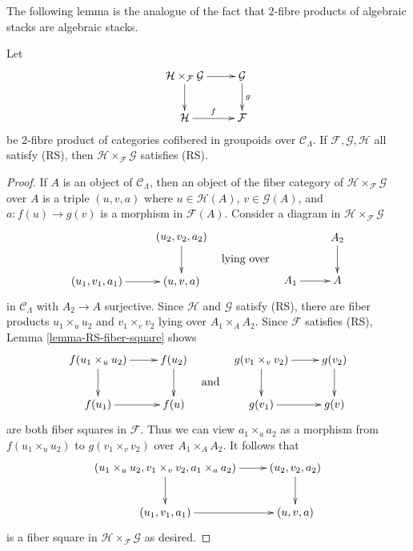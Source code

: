 \noindent
The following lemma is the analogue of the fact that $2$-fibre products
of algebraic stacks are algebraic stacks.

\begin{lemma}
\label{lemma-RS-fiber-product-morphisms}
Let
$$
\xymatrix{
\mathcal{H} \times_\mathcal{F} \mathcal{G} \ar[r] \ar[d] &
\mathcal{G} \ar[d]^g \\
\mathcal{H} \ar[r]^f & \mathcal{F}
}
$$
be $2$-fibre product of categories cofibered in groupoids over
$\mathcal{C}_\Lambda$. If $\mathcal{F}, \mathcal{G}, \mathcal{H}$
all satisfy (RS), then $\mathcal{H} \times_\mathcal{F} \mathcal{G}$
satisfies (RS).
\end{lemma}

\begin{proof}
If $A$ is an object of $\mathcal{C}_\Lambda$, then an object of the fiber
category of $\mathcal{H} \times_\mathcal{F} \mathcal{G}$ over $A$
is a triple $(u, v, a)$ where $u \in \mathcal{H}(A)$, $v \in \mathcal{G}(A)$,
and $a : f(u) \to g(v)$ is a morphism in $\mathcal{F}(A)$. Consider
a diagram in $\mathcal{H} \times_\mathcal{F} \mathcal{G}$
$$
\vcenter{
\xymatrix{
           & (u_2,v_2,a_2) \ar[d] \\
(u_1,v_1,a_1) \ar[r] & (u,v,a)  
}
}
\quad\text{lying over}\quad
\vcenter{
\xymatrix{
           & A_2 \ar[d] \\
A_1 \ar[r] & A   
}
}
$$  
in $\mathcal{C}_\Lambda$ with $A_2 \to A$ surjective. Since
$\mathcal{H}$ and $\mathcal{G}$ satisfy (RS), there are fiber
products $u_1 \times_{u} u_2$ and $v_1 \times_{v} v_2$ lying over
$A_1 \times_A A_2$. Since $\mathcal{F}$ satisfies (RS),
Lemma \ref{lemma-RS-fiber-square} shows
$$
\vcenter{
\xymatrix{
f(u_1 \times_{u} u_2) \ar[r] \ar[d] & f(u_2) \ar[d] \\
f(u_1) \ar[r] & f(u)
}
}
\quad\text{and}\quad
\vcenter{
\xymatrix{
g(v_1 \times_{v} v_2) \ar[r] \ar[d] & g(v_2) \ar[d] \\ 
g(v_1) \ar[r] & g(v)
}
}
$$
are both fiber squares in $\mathcal{F}$. Thus we can view
$a_1 \times_a a_2$ as a morphism from $f(u_1 \times_{u} u_2)$ to
$g(v_1 \times_{v} v_2)$ over $A_1 \times_A A_2$.
It follows that
$$
\xymatrix{
 (u_1 \times_{u} u_2, v_1 \times_{v} v_2, a_{1} \times_{a} a_2) \ar[d] \ar[r] & 
(u_2,v_2,a_2) \ar[d] \\
(u_1,v_1,a_1) \ar[r] & (u,v,a)  
}
$$
is a fiber square in $\mathcal{H} \times_\mathcal{F} \mathcal{G}$
as desired.
\end{proof}


















